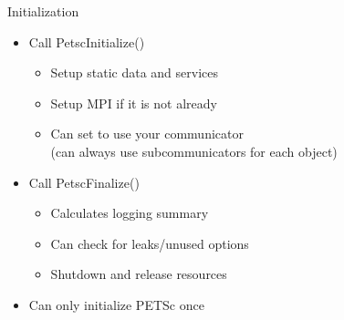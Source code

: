 \begin{frame}{Initialization}

\begin{itemize}
  \item Call {\kb PetscInitialize()}
  \begin{itemize}
    \item Setup static data and services
    \item Setup MPI if it is not already
    \item Can set  to use your communicator \\
      (can always use subcommunicators for each object)
  \end{itemize}

  \item Call {\kb PetscFinalize()}
  \begin{itemize}
    \item Calculates logging summary
    \item Can check for leaks/unused options
    \item Shutdown and release resources
  \end{itemize}

  \item Can only initialize PETSc once
\end{itemize}

\end{frame}
